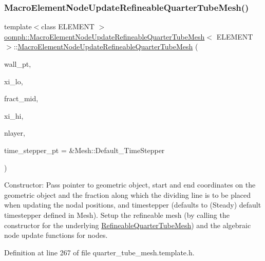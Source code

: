 \subsubsection{\texorpdfstring{Macro\+Element\+Node\+Update\+Refineable\+Quarter\+Tube\+Mesh()}{MacroElementNodeUpdateRefineableQuarterTubeMesh()}}
{\footnotesize\ttfamily template$<$class E\+L\+E\+M\+E\+NT $>$ \\
\hyperlink{classoomph_1_1MacroElementNodeUpdateRefineableQuarterTubeMesh}{oomph\+::\+Macro\+Element\+Node\+Update\+Refineable\+Quarter\+Tube\+Mesh}$<$ E\+L\+E\+M\+E\+NT $>$\+::\hyperlink{classoomph_1_1MacroElementNodeUpdateRefineableQuarterTubeMesh}{Macro\+Element\+Node\+Update\+Refineable\+Quarter\+Tube\+Mesh} (\begin{DoxyParamCaption}\item[{Geom\+Object $\ast$}]{wall\+\_\+pt,  }\item[{const Vector$<$ double $>$ \&}]{xi\+\_\+lo,  }\item[{const double \&}]{fract\+\_\+mid,  }\item[{const Vector$<$ double $>$ \&}]{xi\+\_\+hi,  }\item[{const unsigned \&}]{nlayer,  }\item[{Time\+Stepper $\ast$}]{time\+\_\+stepper\+\_\+pt = {\ttfamily \&Mesh\+:\+:Default\+\_\+TimeStepper} }\end{DoxyParamCaption})\hspace{0.3cm}{\ttfamily [inline]}}



Constructor\+: Pass pointer to geometric object, start and end coordinates on the geometric object and the fraction along which the dividing line is to be placed when updating the nodal positions, and timestepper (defaults to (Steady) default timestepper defined in Mesh). Setup the refineable mesh (by calling the constructor for the underlying \hyperlink{classoomph_1_1RefineableQuarterTubeMesh}{Refineable\+Quarter\+Tube\+Mesh}) and the algebraic node update functions for nodes. 



Definition at line 267 of file quarter\+\_\+tube\+\_\+mesh.\+template.\+h.

\mbox{\label{classoomph_1_1MacroElementNodeUpdateRefineableQuarterTubeMesh_ae4a4028ac41a7721c87bd484be894d02}} 
